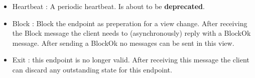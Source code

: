 \begin{itemize}
\item{Heartbeat} : A periodic heartbeat. Is about to be {\bf deprecated}. 
\begin{FormatTable}
\end{FormatTable}

\item{Block} : Block the endpoint as preperation for a view
  change. After receiving the Block message the client needs to
  (asynchronously) reply with a BlockOk message. After sending a
  BlockOk no messages can be sent in this view. 
\begin{FormatTable}
\end{FormatTable}

\item{Exit} : this endpoint is no longer valid. After receiving this
  message the client can discard any outstanding state for this
  endpoint. 
\begin{FormatTable}
\end{FormatTable}

\end{itemize}



